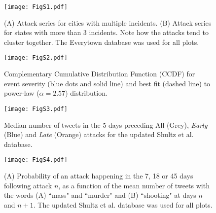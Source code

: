 





\begin{figure*}[ht!]
  \centering
  \texttt{[image: FigS1.pdf]}
  \caption{
    (A) Attack series for cities with multiple incidents. (B)
    Attack series for states with more than 3 incidents. Note how the
    attacks tend to cluster together. The Everytown database was used for
    all plots.
  }
  \label{fig:s_inter}
\end{figure*}         
        
\begin{figure}[ht!]
  \centering
  \texttt{[image: FigS2.pdf]}
  \caption{
    Complementary Cumulative Distribution Function (CCDF) 
    for event severity (blue dots and solid line) 
    and best fit (dashed line) to power-law ($\alpha = 2.57$) distribution.
  } 
  \label{fig:s_pl}
\end{figure}  

\begin{figure}[ht!]
  \centering
  \texttt{[image: FigS3.pdf]}
  \caption{
    Median number of tweets in the 5 days preceding All (Grey), 
    \textit{Early} (Blue) and \textit{Late} (Orange) attacks 
    for the updated Shultz et al. database.
  }
  \label{fig:s_tweetEarly}
\end{figure}  

\begin{figure*}[ht!]
  \centering
  \texttt{[image: FigS4.pdf]}
  \caption{
    (A) Probability of an attack happening in the 7, 18 or 45
    days following attack $n$, as a function of the mean number of tweets
    with the words (A) ``mass" and ``murder" and (B) ``shooting" at days
    $n$ and ${n+1}$. The updated Shultz et al. database was used for all
    plots.
  }
  \label{fig:s_massMurTwee}
\end{figure*}  

